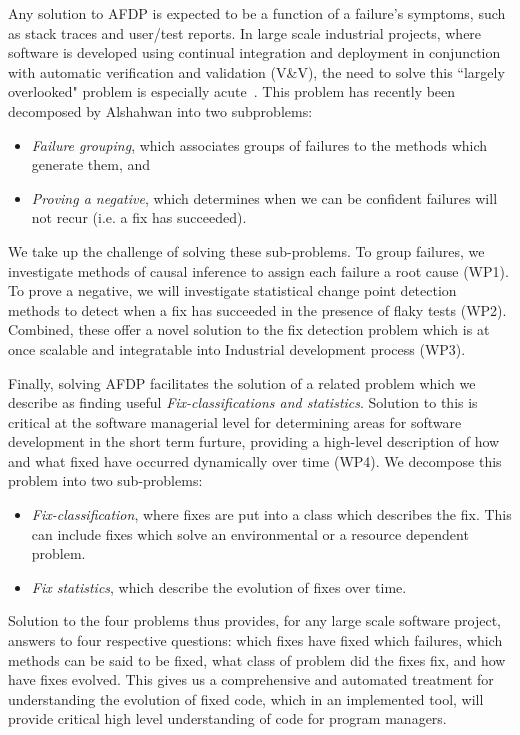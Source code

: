 Any solution to AFDP is expected to be a function of a failure's symptoms, such as stack traces and user/test reports. In large scale industrial projects, where software is developed using continual integration and deployment in conjunction with automatic verification and validation (V\&V), the need to solve this ``largely overlooked" problem is especially acute~\cite{Facebook1}.
This problem has recently been decomposed by Alshahwan \etal  into two subproblems: 

\begin{itemize}
\item  \emph{Failure grouping}, which associates groups of failures to the methods which generate them, and 

\item \emph{Proving a negative}, which determines when we can be confident failures will not recur (i.e. a fix has succeeded). 
\end{itemize}

We take up the challenge of solving these sub-problems. To group failures, we investigate methods of causal inference to assign each failure a root cause (WP1).  To prove a negative, we will investigate statistical change point detection methods to detect when a fix has succeeded in the presence of flaky tests (WP2). Combined, these offer a novel solution to the fix detection problem which is at once scalable and integratable into Industrial development process (WP3). 

Finally, solving AFDP facilitates the solution of a related problem which we describe as finding useful \textit{Fix-classifications and statistics}. Solution to this is critical at the software managerial level for determining areas for software development in the short term furture, providing a high-level description of how and what fixed have occurred dynamically over time (WP4).  We decompose this problem into two sub-problems:

\begin{itemize}
\item \textit{Fix-classification}, where fixes are put into a class which describes the fix. This can include fixes which solve an environmental or a resource dependent problem.

\item \textit{Fix statistics}, which describe the evolution of fixes over time.
\end{itemize}

Solution to the four problems thus provides, for any large scale software project, answers to four respective questions: which fixes have fixed which failures, which methods can be said to be fixed, what class of problem did the fixes fix, and how have fixes evolved. This gives us a comprehensive and automated treatment for understanding the evolution of fixed code, which in an implemented tool, will provide critical high level understanding of code for program managers. 